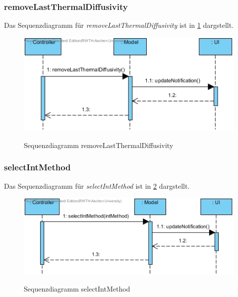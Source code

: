 \subsubsection*{removeLastThermalDiffusivity}

Das Sequenzdiagramm für \emph{removeLastThermalDiffusivity} ist in \ref{Sequenzdiagramm removeLastThermalDiffusivity} dargstellt.

\begin{figure}[H]
	\centering
	\includegraphics[scale=.6]{Bilder/Model__removeLastThermalDiffusivity().jpg}\\
	\caption{Sequenzdiagramm removeLastThermalDiffusivity}
	\label{Sequenzdiagramm removeLastThermalDiffusivity}
\end{figure}

\subsubsection*{selectIntMethod}

Das Sequenzdiagramm für \emph{selectIntMethod} ist in \ref{Sequenzdiagramm selectIntMethod} dargstellt.

\begin{figure}[H]
	\centering
	\includegraphics[scale=.6]{Bilder/Model__selectIntMethod().jpg}\\
	\caption{Sequenzdiagramm selectIntMethod}
	\label{Sequenzdiagramm selectIntMethod}
\end{figure}

